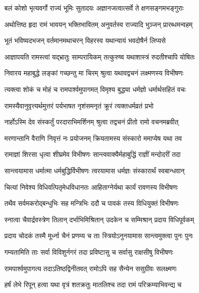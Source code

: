 \twolineshloka
{बलं कोशो भृत्यवर्गो राज्यं भूमिः सुतादयः}
{अज्ञानजत्वात्सर्वे ते क्षणसङ्गमभङ्गुराः} %

\twolineshloka
{अथोत्तिष्ठ हृदा रामं भावयन् भक्तिभावितम्}
{अनुवर्तस्व राज्यादि भुञ्जन् प्रारब्धमन्वहम्} %

\twolineshloka
{भूतं भविष्यदभजन् वर्तमानमथाचरन्}
{विहरस्व यथान्यायं भवदोषैर्न लिप्यसे} %

\twolineshloka
{आज्ञापयति रामस्त्वां यद्भ्रातुः साम्परायिकम्}
{तत्कुरुष्व यथाशास्त्रं रुदतीश्चापि योषितः} %

\twolineshloka
{निवारय महाबुद्धे लङ्कां गच्छन्तु मा चिरम्}
{श्रुत्वा यथावद्वचनं लक्ष्मणस्य विभीषणः} %

\twolineshloka
{त्यक्त्वा शोकं च मोहं च रामपार्श्वमुपागमत्}
{विमृश्य बुद्ध्या धर्मज्ञो धर्मार्थसहितं वचः} %

\twolineshloka
{रामस्यैवानुवृत्त्यर्थमुत्तरं पर्यभाषत}
{नृशंसमनृतं क्रूरं त्यक्तधर्मव्रतं प्रभो} %

\twolineshloka
{नार्होऽस्मि देव संस्कर्तुं परदाराभिमर्शिनम्}
{श्रुत्वा तद्वचनं प्रीतो रामो वचनमब्रवीत्} %

\twolineshloka
{मरणान्तानि वैराणि निवृत्तं नः प्रयोजनम्}
{क्रियतामस्य संस्कारो ममाप्येष यथा तव} %

\twolineshloka
{रामाज्ञां शिरसा धृत्वा शीघ्रमेव विभीषणः}
{सान्त्ववाक्यैर्महाबुद्धिं राज्ञीं मन्दोदरीं तदा} %

\twolineshloka
{सान्त्वयामास धर्मात्मा धर्मबुद्धिर्विभीषणः}
{त्वरयामास धर्मज्ञः संस्कारार्थं स्वबान्धवान्} %

\twolineshloka
{चित्यां निवेश्य विधिवत्पितृमेधविधानतः}
{आहिताग्नेर्यथा कार्यं रावणस्य विभीषणः} %

\twolineshloka
{तथैव सर्वमकरोद्बन्धुभिः सह मन्त्रिभिः}
{ददौ च पावकं तस्य विधियुक्तं विभीषणः} %

\twolineshloka
{स्नात्वा चैवार्द्रवस्त्रेण तिलान् दर्भाभिमिश्रितान्}
{उदकेन च सम्मिश्रान् प्रदाय विधिपूर्वकम्} %

\twolineshloka
{प्रदाय चोदकं तस्मै मूर्ध्ना चैनं प्रणम्य च}
{ताः स्त्रियोऽनुनयामास सान्त्वमुक्त्वा पुनः पुनः} %

\twolineshloka
{गम्यतामिति ताः सर्वा विविशुर्नगरं तदा}
{प्रविष्टासु च सर्वासु राक्षसीषु विभीषणः} %

\twolineshloka
{रामपार्श्वमुपागत्य तदाऽतिष्ठद्विनीतवत्}
{रामोऽपि सह सैन्येन ससुग्रीवः सलक्ष्मणः} %

\twolineshloka
{हर्षं लेभे रिपून् हत्वा यथा वृत्रं शतक्रतुः}
{मातलिश्च तदा रामं परिक्रम्याभिवन्द्य च} %

